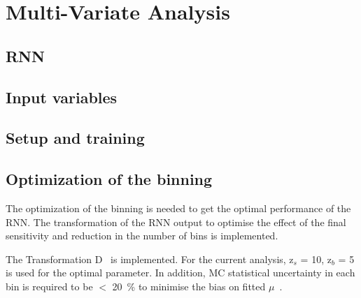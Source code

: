 \chapter{Multi-Variate Analysis}
\section{RNN}
\section{Input variables}
\section{Setup and training}
\section{Optimization of the binning}
The optimization of the binning is needed to get the optimal performance of the RNN. The transformation of the RNN output to optimise the effect of the final sensitivity and reduction in the number of bins is implemented.

The Transformation D~\cite{ATL-PHYS-PUB-2019-009} is implemented.
For the current analysis, z$_s$ = 10, z$_b$ = 5 is used for the optimal parameter. In addition, MC statistical uncertainty in each bin is required to be $<$ 20~\% to minimise the bias on fitted $\mu$~\cite{ATL-PHYS-PUB-2019-009}.